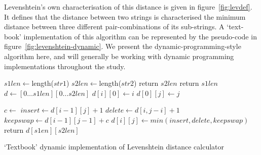 Levenshtein's own characterisation of this distance is given in
figure~\ref{fig:levdef}. It defines that the distance between two
strings is characterised the minimum distance between three different
pair-combinations of its sub-strings. A `text-book' implementation of
this algorithm can be represented by the pseudo-code in
figure~\ref{fig:levenshtein-dynamic}. We present the
dynamic-programming-style algorithm here, and will generally be
working with dynamic programming implementations throughout the study.


    
    

\begin{algorithm}
  \begin{algorithmic}
    \State $s1len \gets $length($str1$)
    \State $s2len \gets $length($str2$)    
    \State return $s2len$
    \EndIf
    \State return $s1len$
    \EndIf
    \State $d \gets [0 \dots s1len][0 \dots s2len]$ 
    \State $d[i][0] \gets i$
    \EndFor
    \State $d[0][j] \gets j$
    \EndFor

    \State $c \gets $
    \State $insert \gets d[i-1][j] + 1$
    \State $delete \gets d[i,j-i] + 1$
    \State $keepswap \gets d[i-1][j-1] + c$
    \State $d[i][j] \gets min(insert, delete, keepswap)$
    \EndFor
    \EndFor
    \State return $d[s1en][s2len]$
    \EndFunction
  \end{algorithmic}
  \caption{`Textbook' dynamic implementation of Levenshtein distance calculator}
  \label{fig:levenshtein-dynamic}
\end{algorithm}


